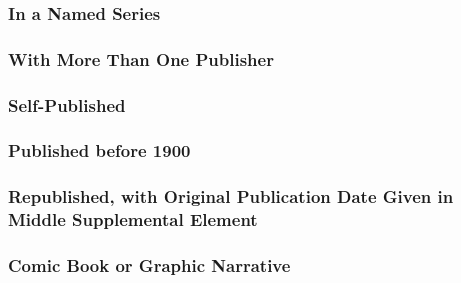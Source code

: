 \documentclass{ltxdockit}
\begin{document}
\subsubsection{In a Named Series} %
\label{ssub:in_a_named_series}
\begin{refsection}
	\printbibliography[heading=none]
\end{refsection}
\subsubsection{With More Than One Publisher} %
\label{ssub:with_more_than_one_publisher}
\begin{refsection}
	\printbibliography[heading=none]
\end{refsection}
\subsubsection{Self-Published} %
\label{ssub:self_published}
\begin{refsection}
	\printbibliography[heading=none]
\end{refsection}
\subsubsection{Published before 1900} %
\label{ssub:published_before_1900}
\begin{refsection}
	\printbibliography[heading=none]
\end{refsection}
\subsubsection{Republished, with Original Publication Date Given in Middle Supplemental Element} %
\label{ssub:republished_with_original_publication_date_given_in_middle_supplemental_element}
\begin{refsection}
	\printbibliography[heading=none]
\end{refsection}
\subsubsection{Comic Book or Graphic Narrative} %
\label{ssub:comic_book_or_graphic_narrative}
\begin{refsection}
	\printbibliography[heading=none]
\end{refsection}
\end{document}
